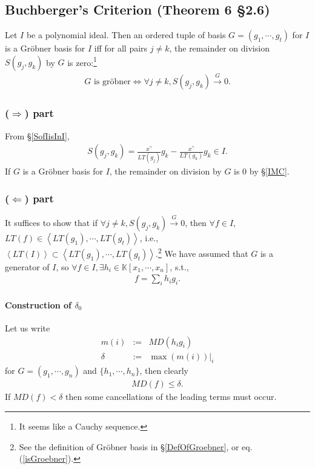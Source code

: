 \documentclass[11pt]{book}
\begin{document}
\subsection{Buchberger's Criterion (Theorem 6 \S2.6)}
\label{Buchberger'sCriterion}
Let $I$ be a polynomial ideal.
Then an ordered tuple of basis $G = (g_1, \cdots, g_t)$ for $I$ is a Gr\"obner basis for $I$ iff for all pairs $j \neq k$, the remainder on division $S(g_j, g_k)$ by $G$ is zero:\footnote{It seems like a Cauchy sequence.} 
\begin{eqnarray}
\text{$G$ is gr\"obner} \Leftrightarrow \forall j\neq k, S(g_j, g_k) \stackrel{G}{\to} 0.
\end{eqnarray}

\subsubsection{($\Rightarrow$) part} 
From \S\ref{SofIisInI},
\begin{eqnarray}
S(g_j, g_k) = \frac{x^\gamma}{LT(g_j)} g_k - \frac{x^\gamma}{LT(g_k)} g_k \in I.
\end{eqnarray}
If $G$ is a Gr\"obner basis for $I$, the remainder on division by $G$ is 0 by \S\ref{IMC}.

\subsubsection{($\Leftarrow$) part} 
It suffices to show that if $ \forall j\neq k, S(g_j, g_k) \stackrel{G}{\to} 0$, then $\forall f \in I$, $LT(f) \in \left< LT(g_1), \cdots, LT(g_t) \right>$, i.e., $\left< LT(I) \right> \subset \left< LT(g_1), \cdots, LT(g_t) \right>$.\footnote{See the definition of Gr\"obner basis in \S\ref{DefOfGroebner}, or eq.(\ref{isGroebner}).
}
We have assumed that $G$ is a generator of $I$, so $\forall f \in I, \exists h_i \in \mathbb{K}[x_1, \cdots, x_n]$, s.t.,
\begin{eqnarray}
f = \sum_i h_i g_i.
\end{eqnarray}

\paragraph{Construction of $\delta_0$}
Let us write
\begin{eqnarray}
m(i) &:=& MD(h_i g_i) \\
\delta &:=& \left.\max\left(m(i) \right) \right|_i
\end{eqnarray}
for $G=(g_1, \cdots, g_n)$ and $\{ h_1, \cdots, h_n \}$, then clearly
\begin{eqnarray}
\label{MDfleqDelta}
MD(f) \leq \delta.
\end{eqnarray}
If $MD(f) < \delta$ then some cancellations of the leading terms must occur.
\end{document}
